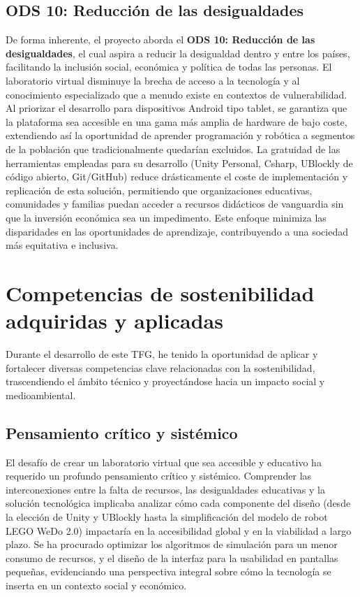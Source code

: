 \subsection{ODS 10: Reducción de las desigualdades}
De forma inherente, el proyecto aborda el \textbf{ODS 10: Reducción de las desigualdades}, el cual aspira a reducir la desigualdad dentro y entre los países, facilitando la inclusión social, económica y política de todas las personas. El laboratorio virtual disminuye la brecha de acceso a la tecnología y al conocimiento especializado que a menudo existe en contextos de vulnerabilidad. Al priorizar el desarrollo para dispositivos Android tipo tablet, se garantiza que la plataforma sea accesible en una gama más amplia de hardware de bajo coste, extendiendo así la oportunidad de aprender programación y robótica a segmentos de la población que tradicionalmente quedarían excluidos. La gratuidad de las herramientas empleadas para su desarrollo (Unity Personal, Csharp, UBlockly de código abierto, Git/GitHub) reduce drásticamente el coste de implementación y replicación de esta solución, permitiendo que organizaciones educativas, comunidades y familias puedan acceder a recursos didácticos de vanguardia sin que la inversión económica sea un impedimento. Este enfoque minimiza las disparidades en las oportunidades de aprendizaje, contribuyendo a una sociedad más equitativa e inclusiva.
\section{Competencias de sostenibilidad adquiridas y aplicadas}
Durante el desarrollo de este TFG, he tenido la oportunidad de aplicar y fortalecer diversas competencias clave relacionadas con la sostenibilidad, trascendiendo el ámbito técnico y proyectándose hacia un impacto social y medioambiental.
\subsection{Pensamiento crítico y sistémico}
El desafío de crear un laboratorio virtual que sea accesible y educativo ha requerido un profundo pensamiento crítico y sistémico. Comprender las interconexiones entre la falta de recursos, las desigualdades educativas y la solución tecnológica implicaba analizar cómo cada componente del diseño (desde la elección de Unity y UBlockly hasta la simplificación del modelo de robot LEGO WeDo 2.0) impactaría en la accesibilidad global y en la viabilidad a largo plazo. Se ha procurado optimizar los algoritmos de simulación para un menor consumo de recursos, y el diseño de la interfaz para la usabilidad en pantallas pequeñas, evidenciando una perspectiva integral sobre cómo la tecnología se inserta en un contexto social y económico.

